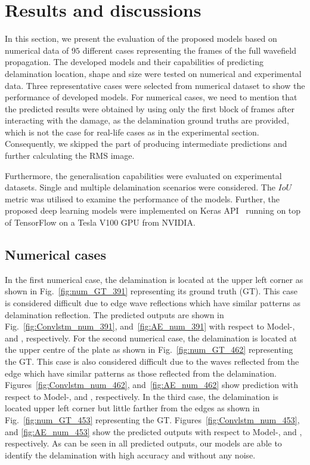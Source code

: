 \section{Results and discussions}
In this section,  we present the evaluation of the proposed models based on numerical data of \(95\) different cases representing the frames of the full wavefield propagation. 
The developed models and their capabilities of predicting delamination location, shape and size were tested on numerical and experimental data.
Three representative cases were selected from numerical dataset to show the performance of developed models.
For numerical cases, we need to mention that the predicted results were obtained by using only the first block of frames after interacting with the damage, as the delamination ground truths are provided, which is not the case for real-life cases as in the experimental section. 
Consequently, we skipped the part of producing intermediate predictions and further calculating the RMS image.

Furthermore, the generalisation capabilities were evaluated on experimental datasets.
Single and multiple delamination scenarios were considered.
The \(IoU\) metric was utilised to examine the performance of the models.
Further, the proposed deep learning models were implemented
on Keras API~\cite{chollet2015keras} running on top of TensorFlow on a Tesla V100 GPU  from NVIDIA. 
\subsection{Numerical cases}
In the first numerical case, the delamination is located at the upper left corner as shown in Fig.~\ref{fig:num_GT_391} representing its ground truth (GT).
This case is considered difficult due to edge wave reflections which have similar patterns as delamination reflection.
The predicted outputs are shown in Fig.~\ref{fig:Convlstm_num_391}, and~\ref{fig:AE_num_391} with respect to Model-, and , respectively.
For the second numerical case, the delamination is located at the upper centre of the plate as shown in Fig.~\ref{fig:num_GT_462} representing the GT.
This case is also considered difficult due to the waves reflected from the edge which have similar patterns as those reflected from the delamination.
Figures~\ref{fig:Convlstm_num_462}, and~\ref{fig:AE_num_462} show prediction with respect to Model-, and , respectively.
In the third case, the delamination is located upper left corner but little farther from the edges as shown in Fig.~\ref{fig:num_GT_453} representing the GT. 
Figures~\ref{fig:Convlstm_num_453}, and \ref{fig:AE_num_453} show the predicted outputs with respect to Model-, and , respectively.
As can be seen in all predicted outputs, our models are able to identify the delamination with high accuracy and without any noise.

